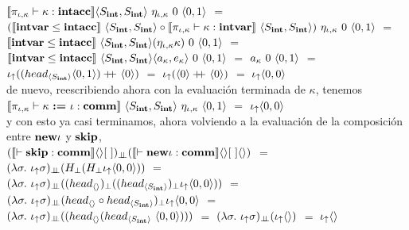 $\llbracket \pi_{\iota,\kappa} \vdash \kappa : \textbf{intacc} \rrbracket
	\langle S_{\textbf{int}},S_{\textbf{int}} \rangle 
	\ \eta_{\iota,\kappa}
	\ 0 \ \langle 0,1 \rangle$ $=$\\
	\indent
$(\semBrcks{\intvar \leq \intacc} \ \lrangles{S_\intt,S_\intt}
	\circ 
	\semBrcks{ \pi_{\iota,\kappa} \vdash \kappa : \intvar } \ \lrangles{S_\intt,S_\intt})
		\ \eta_{\iota,\kappa} 
		\ 0 \ \lrangles{0,1}$ $=$\\
	\indent
$\semBrcks{\intvar \leq \intacc} \ \lrangles{S_\intt,S_\intt} (\eta_{\iota,\kappa} \kappa)
		\ 0 \ \lrangles{0,1}$ $=$\\
	\indent
$\semBrcks{\intvar \leq \intacc} \ \lrangles{S_\intt,S_\intt} \lrangles{a_\kappa,e_\kappa}
		\ 0 \ \lrangles{0,1}$ $=$ $a_\kappa \ 0 \ \langle 0,1 \rangle$ $=$\\
	\indent
$\iota_{\uparrow} ((head_{\langle S_{\textbf{int}} \rangle} \langle 0,1 \rangle) +\kern-1.3ex+\kern0.8ex \langle 0 \rangle)$ $=$
$\iota_{\uparrow} (\langle 0 \rangle +\kern-1.3ex+\kern0.8ex \langle 0 \rangle)$ $=$ $\iota_{\uparrow} \langle 0,0 \rangle$\\

\noindent
de nuevo, reescribiendo ahora con la evaluaci\'on terminada de $\kappa$, tenemos\\

$\llbracket \pi_{\iota,\kappa} \vdash \kappa \ \textbf{:=} \ \iota: \textbf{comm} \rrbracket
		\ \langle S_{\textbf{int}},S_{\textbf{int}} \rangle \ \eta_{\iota,\kappa}
		\ \langle 0,1 \rangle$ $=$ $\iota_{\uparrow} \langle 0,0 \rangle$\\

\noindent
y con esto ya casi terminamos, ahora volviendo a la evaluaci\'on de la composici\'on entre
$\textbf{new} \iota$ y $\textbf{skip}$, \\

$(\llbracket \vdash \textbf{skip} : \textbf{comm} \rrbracket\langle  \rangle[ \ ])_{\bot \!\!\! \bot}
(\llbracket \vdash \textbf{new} \iota : \textbf{comm} \rrbracket\langle  \rangle[ \ ]\langle  \rangle)$
$=$\\
\indent 
$(\lambda \sigma . \ \iota_{\uparrow} \sigma)_{\bot \!\!\! \bot} (H_{\bot} (H_{\bot} \iota_{\uparrow} \langle 0,0 \rangle))$ $=$\\
\indent
$(\lambda \sigma . \ \iota_{\uparrow} \sigma)_{\bot \!\!\! \bot}
	((head_{\langle  \rangle})_{\bot} ((head_{\langle S_{\textbf{int}} \rangle})_{\bot} \iota_{\uparrow} \langle 0,0 \rangle))$ $=$\\
\indent
$(\lambda \sigma . \ \iota_{\uparrow} \sigma)_{\bot \!\!\! \bot}
	(head_{\langle  \rangle} \circ head_{\langle S_{\textbf{int}} \rangle})_{\bot} \iota_{\uparrow} \langle 0,0 \rangle$ $=$\\
\indent
$(\lambda \sigma . \ \iotabot \sigma)_{\dbot}
	((head_{\lrangles{}} (head_{\lrangles{S_\intt}} \ \lrangles{0,0})))$ $=$
$(\lambda \sigma . \ \iota_{\uparrow} \sigma)_{\bot \!\!\! \bot} (\iota_{\uparrow} \langle  \rangle)$ $=$ 
$\iota_{\uparrow} \langle  \rangle$\\

